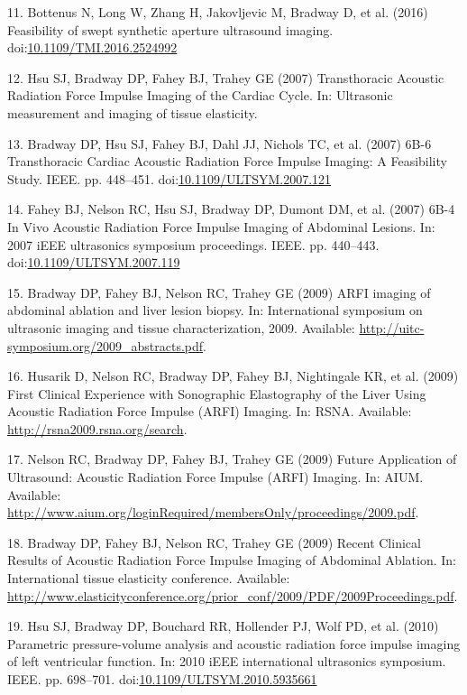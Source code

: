 \documentclass[letterpaper,10pt,english]{sphinxmanual}
\begin{document}
11. Bottenus N, Long W, Zhang H, Jakovljevic M, Bradway D, et al. (2016)
Feasibility of swept synthetic aperture ultrasound imaging.
doi:\href{http://dx.doi.org/10.1109/TMI.2016.2524992}{10.1109/TMI.2016.2524992}

12. Hsu SJ, Bradway DP, Fahey BJ, Trahey GE (2007) Transthoracic
Acoustic Radiation Force Impulse Imaging of the Cardiac Cycle. In:
Ultrasonic measurement and imaging of tissue elasticity.

13. Bradway DP, Hsu SJ, Fahey BJ, Dahl JJ, Nichols TC, et al. (2007)
6B-6 Transthoracic Cardiac Acoustic Radiation Force Impulse Imaging: A
Feasibility Study. IEEE. pp. 448–451.
doi:\href{http://dx.doi.org/10.1109/ULTSYM.2007.121}{10.1109/ULTSYM.2007.121}

14. Fahey BJ, Nelson RC, Hsu SJ, Bradway DP, Dumont DM, et al. (2007)
6B-4 In Vivo Acoustic Radiation Force Impulse Imaging of Abdominal
Lesions. In: 2007 iEEE ultrasonics symposium proceedings. IEEE. pp.
440–443.
doi:\href{http://dx.doi.org/10.1109/ULTSYM.2007.119}{10.1109/ULTSYM.2007.119}

15. Bradway DP, Fahey BJ, Nelson RC, Trahey GE (2009) ARFI imaging of
abdominal ablation and liver lesion biopsy. In: International symposium
on ultrasonic imaging and tissue characterization, 2009. Available:
\href{http://uitc-symposium.org/2009\_abstracts.pdf}{http://uitc-symposium.org/2009\_abstracts.pdf}.

16. Husarik D, Nelson RC, Bradway DP, Fahey BJ, Nightingale KR, et al.
(2009) First Clinical Experience with Sonographic Elastography of the
Liver Using Acoustic Radiation Force Impulse (ARFI) Imaging. In: RSNA.
Available: \href{http://rsna2009.rsna.org/search}{http://rsna2009.rsna.org/search}.

17. Nelson RC, Bradway DP, Fahey BJ, Trahey GE (2009) Future Application
of Ultrasound: Acoustic Radiation Force Impulse (ARFI) Imaging. In:
AIUM. Available:
\href{http://www.aium.org/loginRequired/membersOnly/proceedings/2009.pdf}{http://www.aium.org/loginRequired/membersOnly/proceedings/2009.pdf}.

18. Bradway DP, Fahey BJ, Nelson RC, Trahey GE (2009) Recent Clinical
Results of Acoustic Radiation Force Impulse Imaging of Abdominal
Ablation. In: International tissue elasticity conference. Available:
\href{http://www.elasticityconference.org/prior\_conf/2009/PDF/2009Proceedings.pdf}{http://www.elasticityconference.org/prior\_conf/2009/PDF/2009Proceedings.pdf}.

19. Hsu SJ, Bradway DP, Bouchard RR, Hollender PJ, Wolf PD, et al.
(2010) Parametric pressure-volume analysis and acoustic radiation force
impulse imaging of left ventricular function. In: 2010 iEEE
international ultrasonics symposium. IEEE. pp. 698–701.
doi:\href{http://dx.doi.org/10.1109/ULTSYM.2010.5935661}{10.1109/ULTSYM.2010.5935661}
\end{document}
